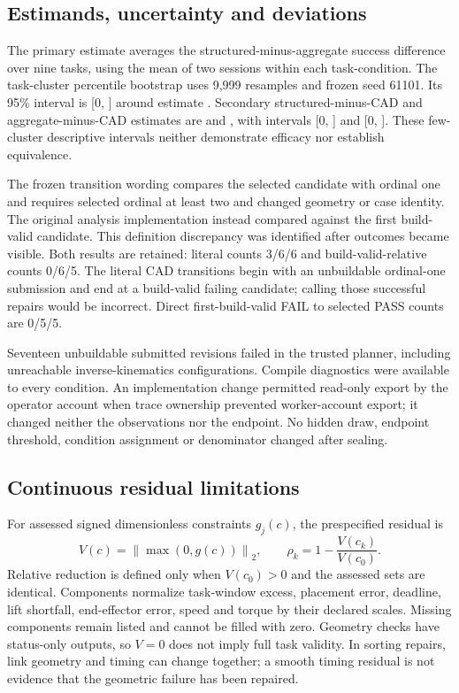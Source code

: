 \subsection{Estimands, uncertainty and deviations}
The primary estimate averages the structured-minus-aggregate success difference over nine tasks, using the mean of two sessions within each task-condition. The task-cluster percentile bootstrap uses 9,999 resamples and frozen seed 61101. Its 95\% interval is [0, \EOnePrimaryHigh{}] around estimate \EOnePrimary{}. Secondary structured-minus-CAD and aggregate-minus-CAD estimates are \EOneStructuredCad{} and \EOneAggregateCad{}, with intervals [0, \EOneStructuredCadHigh{}] and [0, \EOneAggregateCadHigh{}]. These few-cluster descriptive intervals neither demonstrate efficacy nor establish equivalence.

The frozen transition wording compares the selected candidate with ordinal one and requires selected ordinal at least two and changed geometry or case identity. The original analysis implementation instead compared against the first build-valid candidate. This definition discrepancy was identified after outcomes became visible. Both results are retained: literal counts 3/6/6 and build-valid-relative counts 0/6/5. The literal CAD transitions begin with an unbuildable ordinal-one submission and end at a build-valid failing candidate; calling those successful repairs would be incorrect. Direct first-build-valid FAIL to selected PASS counts are 0/5/5.

Seventeen unbuildable submitted revisions failed in the trusted planner, including unreachable inverse-kinematics configurations. Compile diagnostics were available to every condition. An implementation change permitted read-only export by the operator account when trace ownership prevented worker-account export; it changed neither the observations nor the endpoint. No hidden draw, endpoint threshold, condition assignment or denominator changed after sealing.

\subsection{Continuous residual limitations}
For assessed signed dimensionless constraints $g_j(c)$, the prespecified residual is
\begin{equation}
 V(c)=\left\|\max(0,g(c))\right\|_2,\qquad
 \rho_k=1-\frac{V(c_k)}{V(c_0)}.
\end{equation}
Relative reduction is defined only when $V(c_0)>0$ and the assessed sets are identical. Components normalize task-window excess, placement error, deadline, lift shortfall, end-effector error, speed and torque by their declared scales. Missing components remain listed and cannot be filled with zero. Geometry checks have status-only outputs, so $V=0$ does not imply full task validity. In sorting repairs, link geometry and timing can change together; a smooth timing residual is not evidence that the geometric failure has been repaired.

